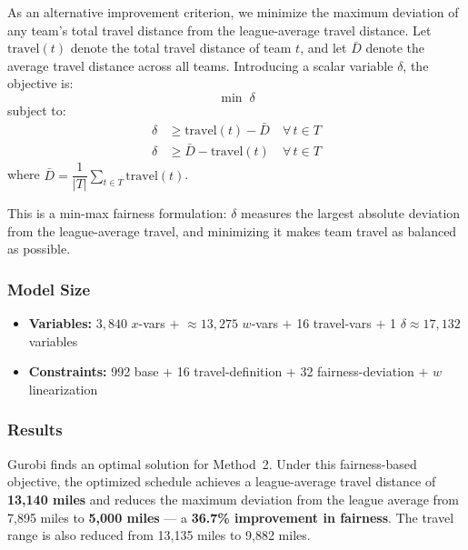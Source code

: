\documentclass[11pt, letterpaper]{article}
\begin{document}
As an alternative improvement criterion, we minimize the maximum deviation of
any team's total travel distance from the league-average travel distance. Let
$\mathrm{travel}(t)$ denote the total travel distance of team $t$, and let
$\bar{D}$ denote the average travel distance across all teams. Introducing a
scalar variable $\delta$, the objective is:
\[
  \min\;\delta
\]
subject to:
\begin{align*}
  \delta &\geq \mathrm{travel}(t) - \bar{D} \quad \forall\, t \in T \\
  \delta &\geq \bar{D} - \mathrm{travel}(t) \quad \forall\, t \in T
\end{align*}
where $\bar{D} = \dfrac{1}{|T|}\displaystyle\sum_{t \in T} \mathrm{travel}(t)$.

This is a min-max fairness formulation: $\delta$ measures the largest absolute
deviation from the league-average travel, and minimizing it makes team travel as
balanced as possible.

\subsubsection*{Model Size}

\begin{itemize}[nosep]
  \item \textbf{Variables:} $3{,}840$ $x$-vars $+$ $\approx 13{,}275$ $w$-vars $+$ 16 travel-vars $+$ 1 $\delta \approx 17{,}132$ variables
  \item \textbf{Constraints:} 992 base $+$ 16 travel-definition $+$ 32 fairness-deviation $+$ $w$ linearization
\end{itemize}

\subsubsection*{Results}

Gurobi finds an optimal solution for Method~2. Under this fairness-based
objective, the optimized schedule achieves a league-average travel distance of
\textbf{13,140 miles} and reduces the maximum deviation from the league average
from 7,895 miles to \textbf{5,000 miles} --- a \textbf{36.7\% improvement in
fairness}. The travel range is also reduced from 13,135 miles to 9,882 miles.
\end{document}
